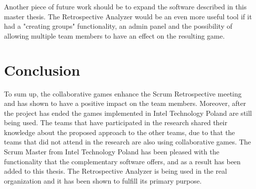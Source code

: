 Another piece of future work should be to expand the software described in this master thesis. The Retrospective Analyzer would be an even more useful tool if it had a "creating groups" functionality, an admin panel and the possibility of allowing multiple team members to have an effect on the resulting game. 

\section{Conclusion}

To sum up, the collaborative games enhance the Scrum Retrospective meeting and has shown to have a positive impact on the team members. Moreover, after the project has ended the games implemented in Intel Technology Poland are still being used. The teams that have participated in the research shared their knowledge about the proposed approach to the other teams, due to that the teams that did not attend in the research are also using collaborative games. The Scrum Master from Intel Technology Poland has been pleased with the functionality that the complementary software offers, and as a result has been added to this thesis. The Retrospective Analyzer is being used in the real organization and it has been shown to fulfill its primary purpose.